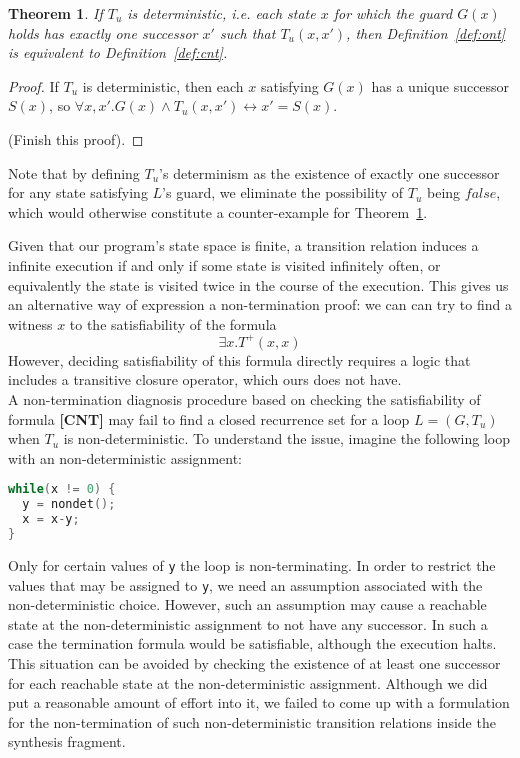 \documentclass[preprint]{sigplanconf}
\newtheorem{theorem}{Theorem}
\theoremstyle{definition}
\begin{document}
\begin{theorem}
\label{thm:cnt}
 If $T_u$ is deterministic, i.e. each state $x$ for which the guard $G(x)$ holds has exactly one successor $x'$ such that $T_u(x, x')$, then
 Definition~\ref{def:ont} is equivalent to Definition~\ref{def:cnt}.
\end{theorem}

\begin{proof}
 If $T_u$ is deterministic, then each $x$ satisfying $G(x)$ has a unique successor $S(x)$, so $\forall x, x' . G(x) \wedge T_u(x, x') \leftrightarrow x' = S(x)$.
 
 (Finish this proof).
\end{proof}

Note that by defining $T_u$'s determinism as the existence of exactly one successor for any state satisfying $L$'s guard, 
we eliminate the possibility of $T_u$ being $false$, which would otherwise constitute a counter-example for Theorem~\ref{thm:cnt}.

Given that our program's state space is finite, a transition relation induces a infinite execution if and only if some state is 
visited infinitely often, or equivalently the state is visited twice in the course of the execution.
This gives us an alternative way of expression a non-termination proof: we can can try to find a witness $x$ to the satisfiability
of the formula
$$ \exists x . T^+(x, x)$$
However, deciding satisfiability of this formula directly requires a logic that includes a transitive closure operator, which
ours does not have.\\

 A non-termination diagnosis procedure based on checking the satisfiability of formula {\bf [CNT]}
may fail to find a closed recurrence set for a loop $L=(G, T_u)$ when $T_u$ is non-deterministic.  
To understand the issue, imagine the following loop with an non-deterministic assignment:

\begin{lstlisting}[language=C]
while(x != 0) {
  y = nondet();
  x = x-y;
}
\end{lstlisting}

Only for certain values of \texttt{y} the loop is non-terminating.
In order to restrict the values that may be assigned to \texttt{y}, we need an assumption associated with the non-deterministic choice. 
However, such an assumption may cause a reachable state at the non-deterministic assignment to not have any successor. In such a case
the termination formula would be satisfiable, although the execution halts. This situation can be avoided by checking the existence of 
at least one successor for each reachable state at the non-deterministic assignment. Although we did put a reasonable amount of effort into it, 
we failed to come up with a formulation for the non-termination of such non-deterministic transition relations 
inside the synthesis fragment.
\end{document}
